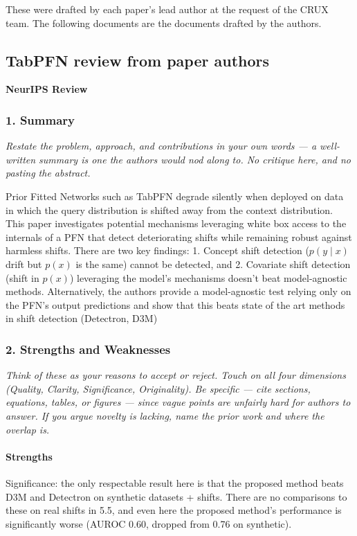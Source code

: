 These were drafted by each paper’s lead author at the request of the CRUX team.
The following documents are the documents drafted by the authors.

\subsection{TabPFN review from paper authors}

\textbf{NeurIPS Review}

\subsubsection*{1. Summary}
{\itshape Restate the problem, approach, and contributions in your own words
--- a well-written summary is one the authors would nod along to. No critique
here, and no pasting the abstract.}

Prior Fitted Networks such as TabPFN degrade silently when deployed on data in
which the query distribution is shifted away from the context distribution.
This paper investigates potential mechanisms leveraging white box access to the
internals of a PFN that detect deteriorating shifts while remaining robust
against harmless shifts. There are two key findings: 1. Concept shift detection
($p(y \mid x)$ drift but $p(x)$ is the same) cannot be detected, and 2.
Covariate shift detection (shift in $p(x)$) leveraging the model's mechanisms
doesn't beat model-agnostic methods. Alternatively, the authors provide a
model-agnostic test relying only on the PFN's output predictions and show that
this beats state of the art methods in shift detection (Detectron, D3M)

\subsubsection*{2. Strengths and Weaknesses}
{\itshape Think of these as your reasons to accept or reject. Touch on all four
dimensions (Quality, Clarity, Significance, Originality). Be specific --- cite
sections, equations, tables, or figures --- since vague points are unfairly
hard for authors to answer. If you argue novelty is lacking, name the prior
work and where the overlap is.}

\paragraph{Strengths}

Significance: the only respectable result here is that the proposed method
beats D3M and Detectron on synthetic datasets + shifts. There are no
comparisons to these on real shifts in 5.5, and even here the proposed method's
performance is significantly worse (AUROC 0.60, dropped from 0.76 on
synthetic).

